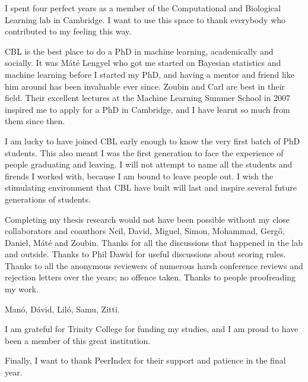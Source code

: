 \begin{acknowledgements}

I spent four perfect years as a member of the Computational and Biological Learning lab in Cambridge. I want to use this space to thank everybody who contributed to my feeling this way.

CBL is the best place to do a PhD in machine learning, academically and socially. It was M\'{a}t\'{e} Lengyel who got me started on Bayesian statistics and machine learning before I started my PhD, and having a mentor and friend like him around has been invaluable ever since. Zoubin and Carl are best in their field. Their excellent lectures at the Machine Learning Summer School in 2007 inspired me to apply for a PhD in Cambridge, and I have learnt so much from them since then.

I am lucky to have joined CBL early enough to know the very first batch of PhD students. This also meant I was the first generation to face the experience of people graduating and leaving. I will not attempt to name all the students and firends I worked with, because I am bound to leave people out. I wish the stimulating environment that CBL have built will last and inspire several future generations of students.

Completing my thesis research would not have been possible without my close collaborators and coauthors Neil, David, Miguel, Simon, Mohammad, Gerg\H{o}, Daniel, M\'{a}t\'{e} and Zoubin. Thanks for all the discussions that happened in the lab and outside. Thanks to Phil Dawid for useful discussions about scoring rules. Thanks to all the anonymous reviewers of numerous harsh conference reviews and rejection letters over the years; no offence taken. Thanks to people proofreading my work. 

Man\'{o}, D\'{a}vid, Lil\'{o}, Samu, Zitti. 


 I am grateful for Trinity College for funding my studies, and I am proud to have been a member of this great institution. 

Finally, I want to thank PeerIndex for their support and patience in the final year.

\end{acknowledgements}